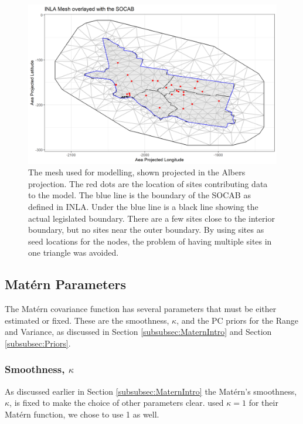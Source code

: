 \documentclass{article}
\begin{document}
\begin{figure}[ht]
    \centering
    \includegraphics[width = \textwidth]{Figures/SOCAB_mesh.png}
    \caption{The mesh used for modelling, shown projected in the Albers projection.  The red dots are the location of sites contributing data to the model.  The blue line is the boundary of the \ac{SOCAB} as defined in \ac{INLA}.  Under the blue line is a black line showing the actual legislated boundary.  There are a few sites close to the interior boundary, but no sites near the outer boundary.  By using sites as seed locations for the nodes, the problem of having multiple sites in one triangle was avoided.}
    \label{fig:SOCAB_mesh}
\end{figure}

\subsection{Mat\'{e}rn Parameters}
\label{subsec:maternparas}
The Mat\'{e}rn covariance function has several parameters that must be either estimated or fixed. These are the smoothness, $\kappa$, and the PC priors for the Range and Variance, as discussed in Section \ref{subsubsec:MaternIntro} and Section \ref{subsubsec:Priors}.

\subsubsection*{Smoothness, $\kappa$}
\label{subsubsec:smoothness}
As discussed earlier in Section \ref{subsubsec:MaternIntro} the Mat\'{e}rn's smoothness, $\kappa$, is fixed to make the choice of other parameters clear.  \cite{cameletti2011spatio} used $\kappa = 1$ for their Mat\'{e}rn  function, we chose to use 1 as well.
\end{document}
